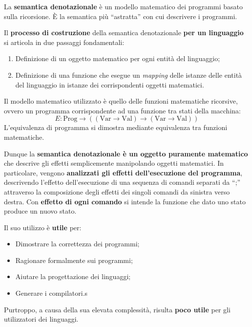 \documentclass[a4paper]{article}
\newcommand{\dquotes}[1]{``#1''}
\begin{document}
	La \textcolor{Red3}{\textbf{semantica denotazionale}} è un modello matematico dei programmi basato sulla ricorsione. È la semantica più \dquotes{astratta} con cui descrivere i programmi.\newline
	
	\noindent
	Il \textbf{processo di costruzione} della semantica denotazionale \textbf{per un linguaggio} si articola in due passaggi fondamentali:
	\begin{enumerate}
		\item Definizione di un oggetto matematico per ogni entità del linguaggio;
		
		\item Definizione di una funzione che esegue un \emph{mapping} delle istanze delle entità del linguaggio in istanze dei corrispondenti oggetti matematici.
	\end{enumerate}
	Il modello matematico utilizzato è quello delle funzioni matematiche ricorsive, ovvero un programma corrispondente ad una funzione tra stati della macchina:
	\begin{equation*}
		E: \mathrm{Prog} \longrightarrow \left( \left(\mathrm{Var} \rightarrow \mathrm{Val}\right) \longrightarrow \left(\mathrm{Var} \rightarrow \mathrm{Val}\right) \right)
	\end{equation*}
	L'equivalenza di programma si dimostra mediante equivalenza tra funzioni matematiche.\newline
	
	\noindent
	Dunque la \textbf{semantica denotazionale è un oggetto puramente matematico} che descrive gli effetti semplicemente manipolando oggetti matematici.\newline
	In particolare, vengono \textbf{analizzati gli effetti dell'esecuzione del programma}, descrivendo l'effetto dell'esecuzione di una sequenza di comandi separati da \dquotes{;} attraverso la composizione degli effetti dei singoli comandi da sinistra verso destra.\newline
	Con \textbf{effetto di ogni comando} si intende la funzione che dato uno stato produce un nuovo stato.\newline
	
	\noindent
	Il suo utilizzo è \textcolor{Green4}{\textbf{utile}} per:
	\begin{itemize}
		\item Dimostrare la correttezza dei programmi;
		\item Ragionare formalmente sui programmi;
		\item Aiutare la progettazione dei linguaggi;
		\item Generare i compilatori.s
	\end{itemize}
	Purtroppo, a causa della sua elevata complessità, risulta \textcolor{Red3}{\textbf{poco utile}} per gli utilizzatori dei linguaggi.\newpage
	
\end{document}
